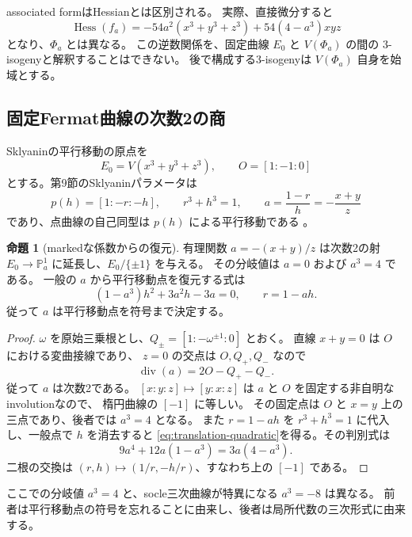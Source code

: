 \documentclass[a4paper,11pt]{ltjsarticle}
\theoremstyle{definition}
\newtheorem{theorem}{命題}[section]
\newcommand{\PP}{\mathbb P}
\begin{document}
associated formはHessianとは区別される\cite[Remark 3.1]{AIK}。
実際、直接微分すると
\begin{equation}\label{eq:fat-hessian-distinction}
 \operatorname{Hess}(f_a)
 =-54a^2(x^3+y^3+z^3)+54(4-a^3)xyz
\end{equation}
となり、$\Phi_a$ とは異なる。
この逆数関係を、固定曲線 $E_0$ と $V(\Phi_a)$ の間の
3-isogenyと解釈することはできない。
後で構成する3-isogenyは $V(\Phi_a)$ 自身を始域とする。

\subsection{固定Fermat曲線の次数2の商}

Sklyaninの平行移動の原点を
\[
 E_0=V(x^3+y^3+z^3),\qquad O=[1:-1:0]
\]
とする。第9節のSklyaninパラメータは
\[
 p(h)=[1:-r:-h],\qquad r^3+h^3=1,
 \qquad a=\frac{1-r}{h}=-\frac{x+y}{z}
\]
であり、点曲線の自己同型は $p(h)$ による平行移動である
\cite[Section 2.3]{WWY}。

\begin{theorem}[markedな係数からの復元]\label{thm:translation-double-cover}
有理関数 $a=-(x+y)/z$ は次数2の射
$E_0\to\PP^1_a$ に延長し、$E_0/\{\pm1\}$ を与える。
その分岐値は $a=0$ および $a^3=4$ である。
一般の $a$ から平行移動点を復元する式は
\begin{equation}\label{eq:translation-quadratic}
 (1-a^3)h^2+3a^2h-3a=0,\qquad r=1-ah.
\end{equation}
従って $a$ は平行移動点を符号まで決定する。
\end{theorem}

\begin{proof}
$\omega$ を原始三乗根とし、$Q_\pm=[1:-\omega^{\pm1}:0]$ とおく。
直線 $x+y=0$ は $O$ における変曲接線であり、
$z=0$ の交点は $O,Q_+,Q_-$ なので
\[
 \operatorname{div}(a)=2O-Q_+-Q_-.
\]
従って $a$ は次数2である。
$[x:y:z]\mapsto[y:x:z]$ は $a$ と $O$ を固定する非自明なinvolutionなので、
楕円曲線の $[-1]$ に等しい。
その固定点は $O$ と $x=y$ 上の三点であり、後者では $a^3=4$ となる。
また $r=1-ah$ を $r^3+h^3=1$ に代入し、一般点で $h$ を消去すると
\eqref{eq:translation-quadratic}を得る。その判別式は
\[
 9a^4+12a(1-a^3)=3a(4-a^3).
\]
二根の交換は $(r,h)\mapsto(1/r,-h/r)$、すなわち上の $[-1]$ である。
\end{proof}

ここでの分岐値 $a^3=4$ と、socle三次曲線が特異になる $a^3=-8$ は異なる。
前者は平行移動点の符号を忘れることに由来し、後者は局所代数の三次形式に由来する。
\end{document}
